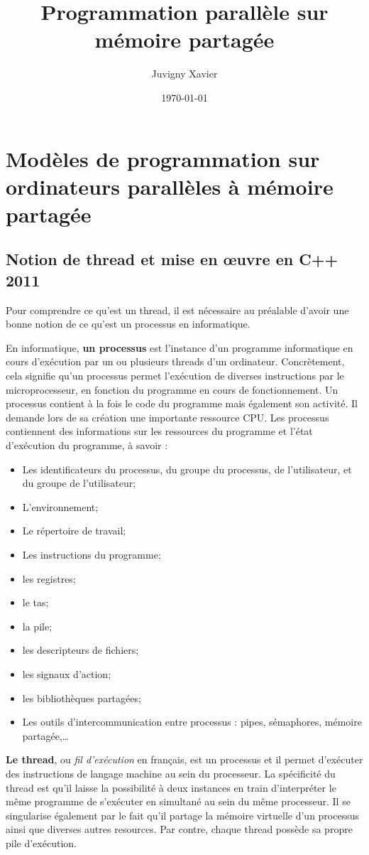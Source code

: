 \documentclass[fleqn,11pt]{article}
\title{Programmation parallèle sur mémoire partagée}
\author{Juvigny Xavier}
\date{\today}
\begin{document}
\maketitle
\tableofcontents

\section{Modèles de programmation sur ordinateurs parallèles à mémoire partagée}

\subsection{Notion de thread et mise en {\oe}uvre en C++ 2011}

Pour comprendre ce qu'est un thread, il est nécessaire au préalable d'avoir une bonne notion de ce
qu'est un processus en informatique.

En informatique, \textbf{un processus} est l’instance d’un programme informatique en cours d’exécution par un ou plusieurs threads d’un ordinateur. Concrètement, cela signifie qu’un processus permet l’exécution de diverses instructions par le microprocesseur, en fonction du programme en cours de fonctionnement. Un processus contient à la fois le code du programme mais également son activité. Il demande lors de sa création une
importante ressource CPU. Les processus contiennent des informations sur les ressources
du programme et l'état d'exécution du programme, à savoir :
\begin{itemize}
 \item Les identificateurs du processus, du groupe du processus, de l'utilisateur, et du groupe de l'utilisateur;
 \item L'environnement;
 \item Le répertoire de travail;
 \item Les instructions du programme;
 \item les registres;
 \item le tas;
 \item la pile;
 \item les descripteurs de fichiers;
 \item les signaux d'action;
 \item les bibliothèques partagées;
 \item Les outils d'intercommunication entre processus : pipes, sémaphores, mémoire partagée,\ldots
\end{itemize}

\textbf{Le thread}, ou \textsl{fil d’exécution} en français, est un  processus et il permet d’exécuter des instructions de langage machine au sein du processeur. La spécificité du thread est qu’il laisse la possibilité à deux instances en train d’interpréter le même programme de s’exécuter en simultané au sein du même processeur. Il se singularise également par le fait qu'il partage la mémoire virtuelle d'un processus ainsi que diverses autres resources. Par contre, chaque thread possède sa propre pile d'exécution.
\end{document}
